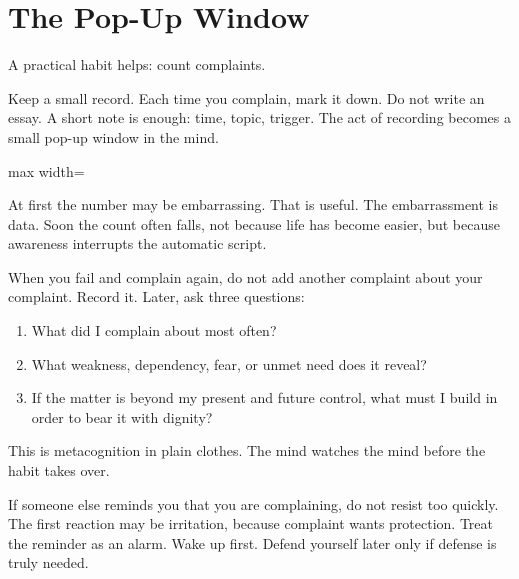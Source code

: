 \section*{The Pop-Up Window}

A practical habit helps: count complaints.

Keep a small record. Each time you complain, mark it down. Do not write an essay. A short note is enough: time, topic, trigger. The act of recording becomes a small pop-up window in the mind.

\begin{center}
\begin{adjustbox}{max width=\linewidth}
\end{adjustbox}
\end{center}

At first the number may be embarrassing. That is useful. The embarrassment is data. Soon the count often falls, not because life has become easier, but because awareness interrupts the automatic script.

When you fail and complain again, do not add another complaint about your complaint. Record it. Later, ask three questions:

\begin{enumerate}
\item What did I complain about most often?
\item What weakness, dependency, fear, or unmet need does it reveal?
\item If the matter is beyond my present and future control, what must I build in order to bear it with dignity?
\end{enumerate}

This is metacognition in plain clothes. The mind watches the mind before the habit takes over.

If someone else reminds you that you are complaining, do not resist too quickly. The first reaction may be irritation, because complaint wants protection. Treat the reminder as an alarm. Wake up first. Defend yourself later only if defense is truly needed.

